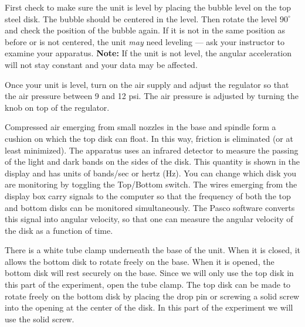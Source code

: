 First check to make sure the unit is level by placing the bubble level
on the top steel disk.  The bubble should be centered in the level.
Then rotate the level $90^{\circ}$ and check the position of the
bubble again.  If it is not in the same position as before or is not
centered, the unit {\em may} need leveling --- ask your instructor to
examine your apparatus.  {\bf Note:} If the unit is not level, the
angular acceleration will not stay constant and your data may be
affected.

Once your unit is level, turn on the
air supply and adjust the regulator so that the air pressure between 9 and 12 psi.
The air pressure is adjusted by turning the knob on top of the regulator.

Compressed air emerging from small nozzles in the base and
spindle form a cushion on which the top disk can float.  In
this way, friction is eliminated (or at least minimized).
The apparatus
uses an infrared detector to measure the passing of the light and dark bands on the
sides of the disk.  This quantity is shown in the display and has units of bands/sec or
hertz (Hz).  You can change which disk you are monitoring by toggling the
Top/Bottom switch.  The wires emerging from the display box carry signals to
the computer so that the frequency of both the top and bottom disks can be
monitored simultaneously.  The Pasco software converts this signal
into angular velocity, so that one can measure the angular velocity of
the disk as a function of time.

There is a white tube clamp underneath the base of
the unit.  When it is closed, it allows the bottom disk to rotate freely on
the base.  When it is opened, the bottom disk will rest securely on the base.
Since we will only use the top disk in this part of the experiment, open the
tube clamp.  The top disk can be made to rotate freely on the bottom disk by
placing the drop pin or screwing a solid screw into the opening at the center
of the disk.  In this part of the experiment we will use the solid screw.

